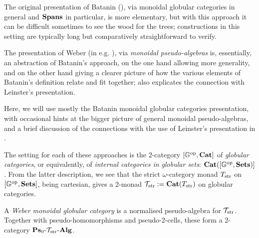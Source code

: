 \documentclass{amsart}
\begin{document}
The original presentation of Batanin (\cite{batanin:natural-environment}), via monoidal globular categories in general and $\Spans$ in particular, is more elementary, but with this approach it can be difficult sometimes to see the wood for the trees; constructions in this setting are typically long but comparatively straightforward to verify.  

The presentation of Weber (in e.g. \cite{weber:operads-within}), via \emph{monoidal pseudo-algebras} is, essentially, an abstraction of Batanin's approach, on the one hand allowing more generality, and on the other hand giving a clearer picture of how the various elements of Batanin's definition relate and fit together; \cite{weber:operads-within} also explicates the connection with Leinster's presentation.

Here, we will use mostly the Batanin monoidal globular categories presentation, with occasional hints at the bigger picture of general monoidal pseudo-algebras, and a brief discussion of the connections with the use of Leinster's presentation in \cite{lumsdaine:tlca}.

The setting for each of these approaches is the 2-category $[\G^\op,\Cat]$ of \emph{globular categories}, or equivalently, of \emph{internal categories in globular sets}: $\intCat[[\G^\op,\Sets]]$.  From the latter description, we see that the strict $\omega$-category monad $T_\str$ on $[\G^\op,\Sets]$, being cartesian, gives a 2-monad $\Tcal_\str := \intCat[T_\str]$ on globular categories.

\begin{definition}
A \emph{Weber monoidal globular category} is a normalised pseudo-algebra for $\Tcal_\str$.  Together with pseudo-homomorphisms and pseudo-2-cells, these form a 2-category $\PsAlg[0]{\Tcal_\str}$.
\end{definition}
\end{document}
